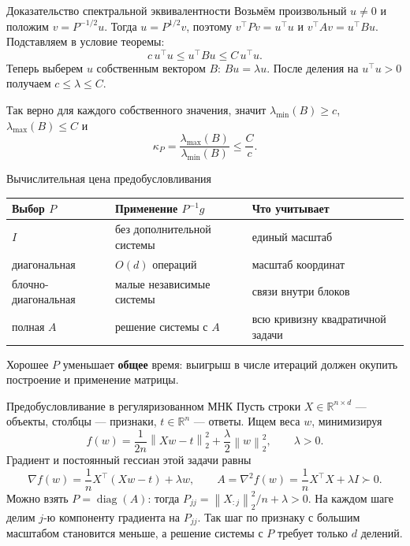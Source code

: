 \documentclass[aspectratio=169,10pt]{beamer}
\newcommand{\R}{\mathbb{R}}
\newcommand{\norm}[1]{\left\lVert #1\right\rVert}
\newcommand{\grad}{\nabla}
\begin{document}
\begin{frame}{Доказательство спектральной эквивалентности}
\footnotesize
Возьмём произвольный $u\ne0$ и положим $v=P^{-1/2}u$.
Тогда $u=P^{1/2}v$, поэтому
$v^\top Pv=u^\top u$ и $v^\top Av=u^\top Bu$.
Подставляем в условие теоремы:
\[
c\,u^\top u\le u^\top Bu\le C\,u^\top u.
\]
Теперь выберем $u$ собственным вектором $B$: $Bu=\lambda u$.
После деления на $u^\top u>0$ получаем $c\le\lambda\le C$.
\par\vspace{.5em}
Так верно для каждого собственного значения, значит
$\lambda_{\min}(B)\ge c$, $\lambda_{\max}(B)\le C$ и
\[
\boxed{\kappa_P=
\frac{\lambda_{\max}(B)}{\lambda_{\min}(B)}
\le\frac{C}{c}.}
\]
\end{frame}

\begin{frame}{Вычислительная цена предобусловливания}
\small
\begin{tabular}{@{}p{.25\linewidth}p{.31\linewidth}p{.33\linewidth}@{}}
\toprule
Выбор $P$ & Применение $P^{-1}g$ & Что учитывает\\
\midrule
$I$ & без дополнительной системы & единый масштаб\\
диагональная & $O(d)$ операций & масштаб координат\\
блочно-диагональная & малые независимые системы & связи внутри блоков\\
полная $A$ & решение системы с $A$ & всю кривизну квадратичной задачи\\
\bottomrule
\end{tabular}
\par\vspace{.5em}
Хорошее $P$ уменьшает \textbf{общее} время: выигрыш в числе итераций должен окупить построение и применение матрицы.
\end{frame}

\begin{frame}{Предобусловливание в регуляризованном МНК}
\footnotesize
Пусть строки $X\in\R^{n\times d}$ --- объекты, столбцы --- признаки, $t\in\R^n$ --- ответы.
Ищем веса $w$, минимизируя
\[
f(w)=\frac{1}{2n}\norm{Xw-t}_2^2+\frac{\lambda}{2}\norm w_2^2,\qquad\lambda>0.
\]
Градиент и постоянный гессиан этой задачи равны
\[
\grad f(w)=\frac1nX^\top(Xw-t)+\lambda w,\qquad
A=\grad^2f(w)=\frac1nX^\top X+\lambda I\succ0.
\]
Можно взять $P=\operatorname{diag}(A)$: тогда
$P_{jj}=\norm{X_{:j}}_2^2/n+\lambda>0$.
На каждом шаге делим $j$-ю компоненту градиента на $P_{jj}$.
Так шаг по признаку с большим масштабом становится меньше, а решение системы с $P$ требует только $d$ делений.
\end{frame}
\end{document}

